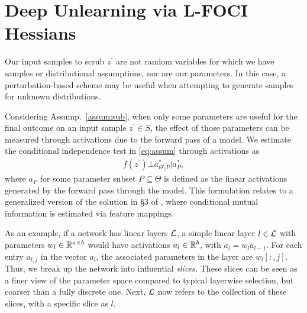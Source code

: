\section{Deep Unlearning via L-FOCI Hessians}
\label{sec:deepunlearn}

Our input samples to scrub $z^\prime$ are not random variables for which we have samples or distributional assumptions, nor are our parameters. In this case, 
a perturbation-based scheme may be useful when attempting to generate samples for unknown distributions.

Considering Assump.~\ref{assum:sub}, when only some parameters are useful for the final outcome on an input sample $z^\prime \in S$, the effect of those parameters can be measured through activations due to the forward pass of a model. We estimate the conditional independence test in \eqref{eq:assum} through activations as
\begin{align}
    f(z^\prime) \bot a_{\Theta\setminus P}^* | a_P^*,
\end{align}
where $a_P$ for some parameter subset $P \subseteq \Theta$ is defined as the linear activations generated by the forward pass through the model.
This formulation relates to a generalized version of the solution in \S3 of \cite{bullseye}, where conditional mutual information is estimated via feature mappings.

As an example, if a network has linear layers $\mathcal{L}$, a simple linear layer $l \in \mathcal{L}$ with parameters $w_l \in \mathbb{R}^{a \times b}$ would have activations $a_l \in \mathbb{R}^b$, with $a_l = w_l a_{l-1}$. For each entry $a_{l,j}$ in the vector $a_l$, the associated parameters in the layer are $w_l[:,j]$. Thus, we break up the network into influential \textit{slices.} These slices can be seen as a finer view of the parameter space compared to typical layerwise selection, but coarser than a fully discrete one. Next, $\mathcal{L}$ now refers to the collection of these slices, with a specific slice as $l$.

